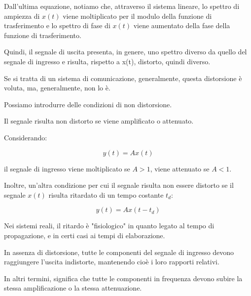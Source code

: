 Dall'ultima equazione, notiamo che, attraverso il sistema lineare, lo spettro di ampiezza di 
$x(t)$ viene moltiplicato per il modulo della funzione di trasferimento e lo spettro di fase 
di $x(t)$ viene aumentato della fase della funzione di trasferimento. \newline 

Quindi, il segnale di uscita presenta, in genere, uno spettro diverso da quello del segnale di ingresso 
e risulta, rispetto a x(t), distorto, quindi diverso. \newline 

Se si tratta di un sistema di comunicazione, generalmente, questa distorsione è voluta, 
ma, generalmente, non lo è. \newline 

Possiamo introdurre delle condizioni di non distorsione.\newline 

Il segnale risulta non distorto se viene amplificato o attenuato. \newline 

Considerando: 

{
    \Large 
    \begin{equation}
        y(t) = A x(t)
    \end{equation}
}

il segnale di ingresso viene moltiplicato se $A > 1$, viene attenuato se $A < 1$. \newline 

Inoltre, un'altra condizione per cui il segnale risulta non essere distorto se il segnale 
$x(t)$ risulta ritardato di un tempo costante $t_d$: 

{
    \Large 
    \begin{equation}
        y(t) = A x(t - t_d)
    \end{equation}
}

Nei sistemi reali, il ritardo è "fisiologico" in quanto legato al tempo di propagazione, 
e in certi casi ai tempi di elaborazione. \newline 

In assenza di distorsione, tutte le componenti del segnale di ingresso devono raggiungere 
l'uscita indistorte, mantenendo cioè i loro rapporti relativi. \newline 

In altri termini, significa che tutte le componenti in frequenza devono subire la stessa amplificazione o la stessa attenuazione. \newline 

